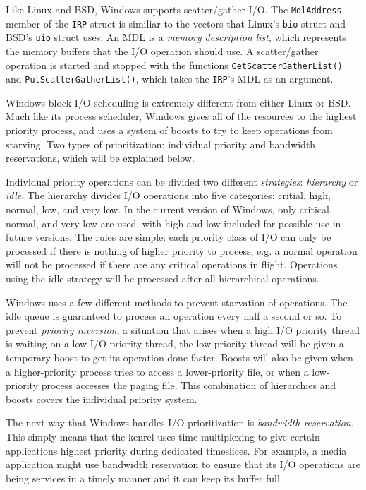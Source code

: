 \documentclass[10pt,journal,draftclsnofoot,onecolumn]{IEEEtran}
\begin{document}


Like Linux and BSD, Windows supports scatter/gather I/O. The
\texttt{MdlAddress} member of the \texttt{IRP} struct is similiar
to the vectors that Linux's \texttt{bio} struct and BSD's
\texttt{uio} struct uses. An MDL is a \textit{memory description list},
which represents the memory buffers that the I/O operation should use.
A scatter/gather operation is started and stopped with the functions
\texttt{GetScatterGatherList()} and \texttt{PutScatterGatherList()}, which
takes the \texttt{IRP}'s MDL as an argument.

Windows block I/O scheduling is extremely different from either 
Linux or BSD. Much like its process scheduler, Windows gives
all of the resources to the highest priority process, and uses a system
of boosts to try to keep operations from starving.
Two types of prioritization: individual priority and bandwidth
reservations, which will be explained below.

Individual priority operations can be divided two different
\textit{strategies}: \textit{hierarchy} or \textit{idle}.
The hierarchy divides I/O operations into five
categories: critial, high, normal, low, and very low. In the current
version of Windows, only critical, normal, and very low are used, with high
and low included for possible use in future versions. The rules
are simple: each priority class of I/O can only be processed if there
is nothing of higher priority to process, e.g. a normal operation will
not be processed if there are any critical operations in flight. Operations
using the idle strategy will be processed after all hierarchical operations.

Windows uses a few different methods to prevent starvation of operations.
The idle queue is guaranteed to process an operation every half a second or
so. To prevent \textit{priority inversion}, a situation that arises when
a high I/O priority thread is waiting on a low I/O priority thread,
the low priority thread will be given a temporary boost to get its
operation done faster. Boosts will also be given when a higher-priority
process tries to access a lower-priority file, or when a low-priority
process accesses the paging file. This combination of hierarchies and
boosts covers the individual priority system.

The next way that Windows handles I/O prioritization is
\textit{bandwidth reservation}. This simply means that the kenrel
uses time multiplexing to give certain applications highest priority
during dedicated timeslices. For example, a media application might
use bandwidth reservation to ensure that its I/O operations are being
services in a timely manner and it can
keep its buffer full~\cite{win-int-two}.
\end{document}
